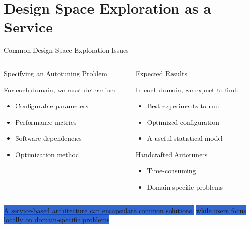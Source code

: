 \documentclass[10pt, compress, aspectratio=169, xcolor={table,usenames,dvipsnames}]{beamer}
\begin{document}
\section{Design Space Exploration as a Service}
\label{sec:org3b8c54d}
\begin{frame}[label={sec:org94dd3cf}]{Common Design Space Exploration Issues}
\begin{columns}
\begin{column}{0.5\columnwidth}
\begin{block}{Specifying an Autotuning Problem}
\vspace{0.8em}

For each domain, we must determine:

\begin{itemize}
\item Configurable parameters
\item Performance metrics
\item Software dependencies
\item Optimization method
\end{itemize}
\end{block}
\end{column}

\begin{column}{0.5\columnwidth}
\begin{block}{Expected Results}
\vspace{0.8em}

In each domain, we expect to find:

\begin{itemize}
\item Best experiments to run
\item Optimized configuration
\item A useful \alert{statistical model}
\end{itemize}

\begin{block}{Handcrafted Autotuners}
\begin{itemize}
\item Time-consuming
\item Domain-specific problems
\end{itemize}
\end{block}
\end{block}
\end{column}
\end{columns}

\begin{center}
  \colorbox{Highlight}{A \alert{service-based architecture} can encapsulate common solutions,}
  \colorbox{Highlight}{while users focus locally on \alert{domain-specific problems}}
\end{center}
\end{frame}
\end{document}
